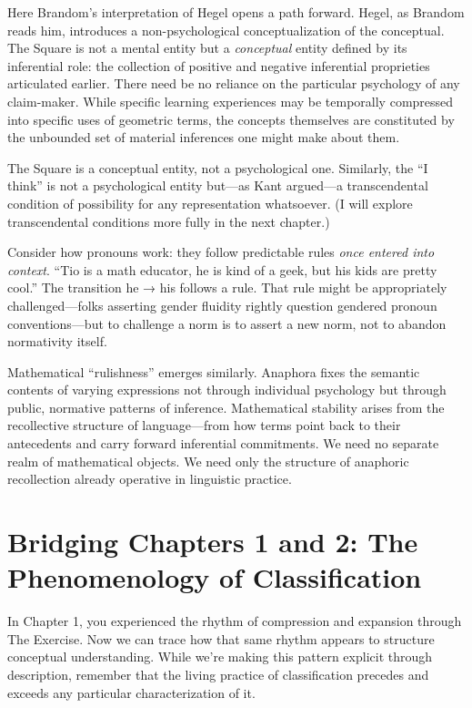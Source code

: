 \documentclass[12pt]{book}
\begin{document}
Here Brandom's interpretation of Hegel opens a path forward. Hegel, as Brandom reads him, introduces a non-psychological conceptualization of the conceptual. The Square is not a mental entity but a \emph{conceptual} entity defined by its inferential role: the collection of positive and negative inferential proprieties articulated earlier. There need be no reliance on the particular psychology of any claim-maker. While specific learning experiences may be temporally compressed into specific uses of geometric terms, the concepts themselves are constituted by the unbounded set of material inferences one might make about them.

The Square is a conceptual entity, not a psychological one. Similarly, the ``I think'' is not a psychological entity but---as Kant argued---a transcendental condition of possibility for any representation whatsoever. (I will explore transcendental conditions more fully in the next chapter.)

Consider how pronouns work: they follow predictable rules \emph{once entered into context}. ``Tio is a math educator, he is kind of a geek, but his kids are pretty cool.'' The transition he → his follows a rule. That rule might be appropriately challenged---folks asserting gender fluidity rightly question gendered pronoun conventions---but to challenge a norm is to assert a new norm, not to abandon normativity itself.

Mathematical ``rulishness'' emerges similarly. Anaphora fixes the semantic contents of varying expressions not through individual psychology but through public, normative patterns of inference. Mathematical stability arises from the recollective structure of language---from how terms point back to their antecedents and carry forward inferential commitments. We need no separate realm of mathematical objects. We need only the structure of anaphoric recollection already operative in linguistic practice.

\section{Bridging Chapters 1 and 2: The Phenomenology of Classification}\label{bridging-chapters-1-and-2-the-phenomenology-of-classification}

In Chapter 1, you experienced the rhythm of compression and expansion through The Exercise. Now we can trace how that same rhythm appears to structure conceptual understanding. While we're making this pattern explicit through description, remember that the living practice of classification precedes and exceeds any particular characterization of it.
\end{document}
